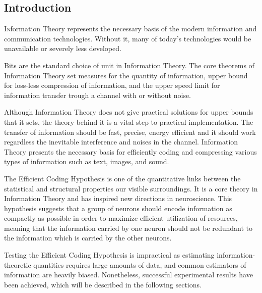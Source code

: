 \documentclass[twoside]{article}
\begin{document}
\begin{multicols}{2} %

\section{Introduction}

\lettrine[nindent=0em,lines=3]{I}nformation Theory represents the necessary basis of the modern information and communication technologies. Without it, many of today's technologies would be unavailable or severely less developed.

Bits are the standard choice of unit in Information Theory. The core theorems of Information Theory set measures for the quantity of information, upper bound for loss-less compression of information, and the upper speed limit for information transfer trough a channel with or without noise. 

Although Information Theory does not give practical solutions for upper bounds that it sets, the theory behind it is a vital step to practical implementation. The transfer of information should be fast, precise, energy efficient and it should work regardless the inevitable interference and noises in the channel. Information Theory presents the necessary basis for efficiently coding and compressing various types of information such as text, images, and sound. 

The Efficient Coding Hypothesis is one of the quantitative links between the statistical and structural properties our visible surroundings. It is a core theory in Information Theory and has inspired new directions in neuroscience. This hypothesis suggests that a group of neurons should encode information as compactly as possible in order to maximize efficient utilization of resources, meaning that the information carried by one neuron should not be redundant to the information which is carried by the other neurons. 

Testing the Efficient Coding Hypothesis is impractical as estimating information-theoretic quantities requires large amounts of data, and common estimators of information are heavily biased. Nonetheless, successful experimental results have been achieved, which will be described in the following sections.





\end{multicols}
\end{document}
